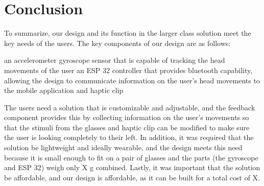 \chapter{Conclusion}
\label{chap:conclusion}

To summarize, our design and its function in the larger class solution meet the key needs of the users. The key components of our design are as follows:

an accelerometer gyroscope sensor that is capable of tracking the head movements of the user
an ESP 32 controller that provides bluetooth capability, allowing the design to communicate information on the user’s head movements to the mobile application and haptic clip

The users need a solution that is customizable and adjustable, and the feedback component provides this by collecting information on the user’s movements so that the stimuli from the glasses and haptic clip can be modified to make sure the user is looking completely to their left. In addition, it was required that the solution be lightweight and ideally wearable, and the design meets this need because it is small enough to fit on a pair of glasses and the parts (the gyroscope and ESP 32) weigh only  X g combined. Lastly, it was important that the solution be affordable, and our design is affordable, as it can be built for a total cost of  X. 

